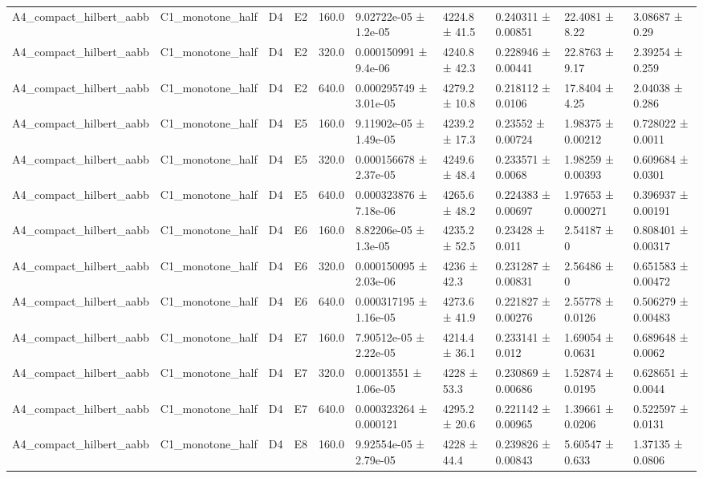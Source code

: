 \begin{table}
\begin{tabular}{llllllllll}
A4\_compact\_hilbert\_aabb & C1\_monotone\_half & D4 & E2 & 160.0 & 9.02722e-05 ± 1.2e-05 & 4224.8 ± 41.5 & 0.240311 ± 0.00851 & 22.4081 ± 8.22 & 3.08687 ± 0.29 \\
A4\_compact\_hilbert\_aabb & C1\_monotone\_half & D4 & E2 & 320.0 & 0.000150991 ± 9.4e-06 & 4240.8 ± 42.3 & 0.228946 ± 0.00441 & 22.8763 ± 9.17 & 2.39254 ± 0.259 \\
A4\_compact\_hilbert\_aabb & C1\_monotone\_half & D4 & E2 & 640.0 & 0.000295749 ± 3.01e-05 & 4279.2 ± 10.8 & 0.218112 ± 0.0106 & 17.8404 ± 4.25 & 2.04038 ± 0.286 \\
A4\_compact\_hilbert\_aabb & C1\_monotone\_half & D4 & E5 & 160.0 & 9.11902e-05 ± 1.49e-05 & 4239.2 ± 17.3 & 0.23552 ± 0.00724 & 1.98375 ± 0.00212 & 0.728022 ± 0.0011 \\
A4\_compact\_hilbert\_aabb & C1\_monotone\_half & D4 & E5 & 320.0 & 0.000156678 ± 2.37e-05 & 4249.6 ± 48.4 & 0.233571 ± 0.0068 & 1.98259 ± 0.00393 & 0.609684 ± 0.0301 \\
A4\_compact\_hilbert\_aabb & C1\_monotone\_half & D4 & E5 & 640.0 & 0.000323876 ± 7.18e-06 & 4265.6 ± 48.2 & 0.224383 ± 0.00697 & 1.97653 ± 0.000271 & 0.396937 ± 0.00191 \\
A4\_compact\_hilbert\_aabb & C1\_monotone\_half & D4 & E6 & 160.0 & 8.82206e-05 ± 1.3e-05 & 4235.2 ± 52.5 & 0.23428 ± 0.011 & 2.54187 ± 0 & 0.808401 ± 0.00317 \\
A4\_compact\_hilbert\_aabb & C1\_monotone\_half & D4 & E6 & 320.0 & 0.000150095 ± 2.03e-06 & 4236 ± 42.3 & 0.231287 ± 0.00831 & 2.56486 ± 0 & 0.651583 ± 0.00472 \\
A4\_compact\_hilbert\_aabb & C1\_monotone\_half & D4 & E6 & 640.0 & 0.000317195 ± 1.16e-05 & 4273.6 ± 41.9 & 0.221827 ± 0.00276 & 2.55778 ± 0.0126 & 0.506279 ± 0.00483 \\
A4\_compact\_hilbert\_aabb & C1\_monotone\_half & D4 & E7 & 160.0 & 7.90512e-05 ± 2.22e-05 & 4214.4 ± 36.1 & 0.233141 ± 0.012 & 1.69054 ± 0.0631 & 0.689648 ± 0.0062 \\
A4\_compact\_hilbert\_aabb & C1\_monotone\_half & D4 & E7 & 320.0 & 0.00013551 ± 1.06e-05 & 4228 ± 53.3 & 0.230869 ± 0.00686 & 1.52874 ± 0.0195 & 0.628651 ± 0.0044 \\
A4\_compact\_hilbert\_aabb & C1\_monotone\_half & D4 & E7 & 640.0 & 0.000323264 ± 0.000121 & 4295.2 ± 20.6 & 0.221142 ± 0.00965 & 1.39661 ± 0.0206 & 0.522597 ± 0.0131 \\
A4\_compact\_hilbert\_aabb & C1\_monotone\_half & D4 & E8 & 160.0 & 9.92554e-05 ± 2.79e-05 & 4228 ± 44.4 & 0.239826 ± 0.00843 & 5.60547 ± 0.633 & 1.37135 ± 0.0806 \\

\end{tabular}
\end{table}
